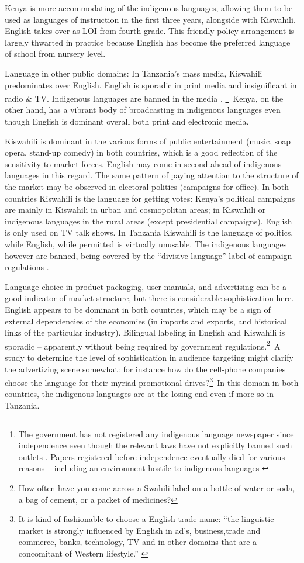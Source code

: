 \documentclass[output=paper,colorlinks,citecolor=brown]{langscibook}
\begin{document}
Kenya is more accommodating of the indigenous languages, allowing them to be used as languages of instruction in the first three years, alongside with Kiswahili. English takes over as LOI from fourth grade. This friendly policy arrangement is largely thwarted in practice because English has become the preferred language of school from nursery level. 

Language in other public domains: In Tanzania’s mass media, Kiswahili predominates over English. English is sporadic in print media and insignificant in radio \& TV. Indigenous languages are banned in the media \citep{TCRA2005}. \footnote{The government has not registered any indigenous language newspaper since independence even though the relevant laws have not explicitly banned such outlets \citep[68--9]{Rugemalira2013}. Papers registered before independence eventually died for various reasons – including an environment hostile to indigenous languages \citep[92]{Madumulla2007}}~Kenya, on the other hand, has a vibrant body of broadcasting in indigenous languages even though English is dominant overall both print and electronic media. 

Kiswahili is dominant in the various forms of public entertainment (music, soap opera, stand-up comedy) in both countries, which is a good reflection of the sensitivity to market forces. English may come in second ahead of indigenous languages in this regard. The same pattern of paying attention to the structure of the market may be observed in electoral politics (campaigns for office). In both countries Kiswahili is the language for getting votes: Kenya’s political campaigns are mainly in Kiswahili in urban and cosmopolitan areas; in Kiswahili or indigenous languages in the rural areas (except presidential campaigns). English is only used on TV talk shows. In Tanzania Kiswahili is the language of politics, while English, while permitted is virtually unusable. The indigenous languages however are banned, being covered by the ``divisive language'' label of campaign regulations \citep{Tanzania-Government2010}.

Language choice in product packaging, user manuals, and advertising can be a good indicator of market structure, but there is considerable sophistication here. English appears to be dominant in both countries, which may be a sign of external dependencies of the economies (in imports and exports, and historical links of the particular industry). Bilingual labeling in English and Kiswahili is sporadic – apparently without being required by government regulations.\footnote{How often have you come across a Swahili label on a bottle of water or soda, a bag of cement, or a packet of medicines?}~A study to determine the level of sophistication in audience targeting might clarify the advertizing scene somewhat: for instance how do the cell-phone companies choose the language for their myriad promotional drives?\footnote{It is kind of fashionable to choose a English trade name: “the linguistic market is strongly influenced by English in ad’s, business,trade and commerce, banks, technology, TV and in other domains that are a concomitant of Western lifestyle.” \citep[64]{Legere2010}}~In this domain in both countries, the indigenous languages are at the losing end even if more so in Tanzania. 
\end{document}

